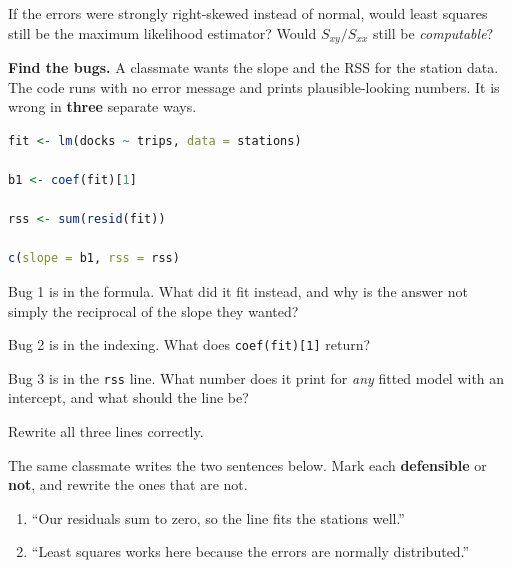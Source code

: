 \documentclass[11pt]{article}
\newcommand{\answerspace}[1]{\vspace{#1}}
\begin{document}
\begin{questions}
\begin{parts}
\item If the errors were strongly right-skewed instead of normal, would least squares still be the
maximum likelihood estimator? Would $S_{xy}/S_{xx}$ still be \emph{computable}?
\answerspace{3.5em}
\end{parts}

\item \textbf{Find the bugs.} A classmate wants the slope and the RSS for the station data. The
code runs with no error message and prints plausible-looking numbers. It is wrong in
\textbf{three} separate ways.

\begin{lstlisting}[language=R]
fit <- lm(docks ~ trips, data = stations)

b1 <- coef(fit)[1]

rss <- sum(resid(fit))

c(slope = b1, rss = rss)
\end{lstlisting}

\begin{parts}
\item Bug 1 is in the formula. What did it fit instead, and why is the answer not simply the
reciprocal of the slope they wanted?
\answerspace{3.5em}

\item Bug 2 is in the indexing. What does \texttt{coef(fit)[1]} return?
\answerspace{3em}

\item Bug 3 is in the \texttt{rss} line. What number does it print for \emph{any} fitted model
with an intercept, and what should the line be?
\answerspace{3.5em}

\item Rewrite all three lines correctly.
\answerspace{3.5em}

\item The same classmate writes the two sentences below. Mark each \textbf{defensible} or
\textbf{not}, and rewrite the ones that are not.
\begin{enumerate}[label=\textbf{S\arabic*.}, leftmargin=2.2em, itemsep=.25em, topsep=.35em]
\item ``Our residuals sum to zero, so the line fits the stations well.''
\item ``Least squares works here because the errors are normally distributed.''
\end{enumerate}
\answerspace{5em}
\end{parts}

\end{questions}
\end{document}
